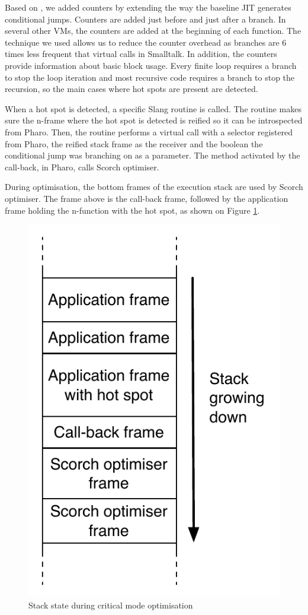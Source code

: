 \documentclass[a4paper,12pt,twoside]{../includes/ThesisStyle}
\begin{document}

Based on \cite{Arn02}, we added counters by extending the way the baseline JIT generates conditional jumps. Counters are added just before and just after a branch. In several other VMs, the counters are added at the beginning of each function. The technique we used allows us to reduce the counter overhead as branches are 6 times less frequent that virtual calls in Smalltalk. In addition, the counters provide information about basic block usage. Every finite loop requires a branch to stop the loop iteration and most recursive code requires a branch to stop the recursion, so the main cases where hot spots are present are detected.

When a hot spot is detected, a specific Slang routine is called. The routine makes sure the n-frame where the hot spot is detected is reified so it can be introspected from Pharo. Then, the routine performs a virtual call with a selector registered from Pharo, the reified stack frame as the receiver and the boolean the conditional jump was branching on as a parameter. The method activated by the call-back, in Pharo, calls Scorch optimiser.

During optimisation, the bottom frames of the execution stack are used by Scorch optimiser. The frame above is the call-back frame, followed by the application frame holding the n-function with the hot spot, as shown on Figure \ref{fig:HotSpotCallBackStack}.

\begin{figure}[h!]
    \begin{center}
        \includegraphics[width=0.35\linewidth]{HotSpotCallBackStack}
        \caption{Stack state during critical mode optimisation}
        \label{fig:HotSpotCallBackStack}
    \end{center}
\end{figure}
\end{document}
